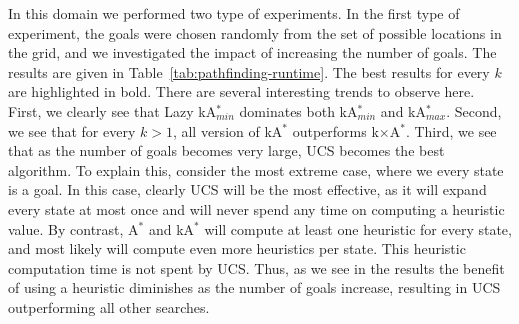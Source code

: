 \documentclass{aicom2e}
\newcommand{\astar}{A$^*$}
\newcommand{\kastar}{kA$^*$}
\newcommand{\kastarmin}{kA$^*_{min}$}
\newcommand{\kastarmax}{kA$^*_{max}$}
\newcommand{\kxastar}{k$\times$A$^*$}
\begin{document}
In this domain we performed two type of experiments. In the first type of experiment, the goals were chosen randomly from the set of possible locations in the grid, and we investigated the impact of increasing the number of goals. The results are given in Table~\ref{tab:pathfinding-runtime}. The best results for every $k$ are highlighted in bold. There are several interesting trends to observe here. First, we clearly see that Lazy \kastarmin{} dominates both \kastarmin{} and \kastarmax{}. Second, we see that for every $k>1$, all version of \kastar{} outperforms \kxastar{}. Third, we see that as the number of goals becomes very large, UCS becomes the best algorithm. To explain this, consider the most extreme case, where we every state is a goal. In this case, clearly UCS will be the most effective, as it will expand every state at most once and will never spend any time on computing a heuristic value. By contrast, \astar{} and \kastar{} will compute at least one heuristic for every state, and most likely will compute even more heuristics per state. This heuristic computation time is not spent by UCS. Thus, as we see in the results the benefit of using a heuristic diminishes as the number of goals increase, resulting in UCS outperforming all other searches. 



\end{document}
